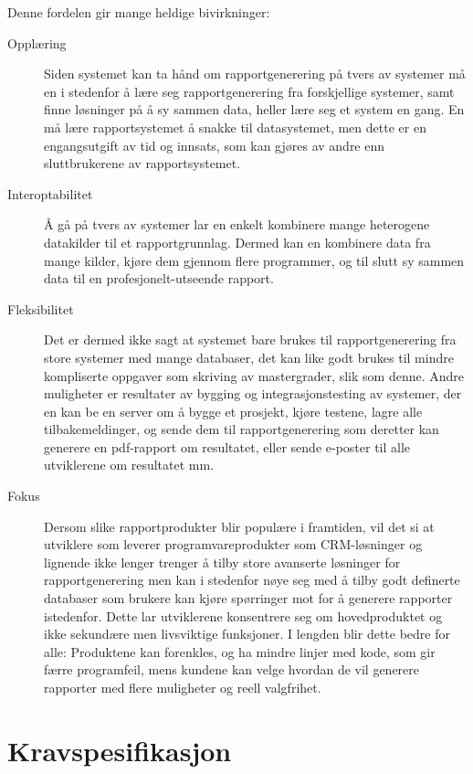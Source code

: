 \documentclass[11pt]{article}
\begin{document}
Denne fordelen gir mange heldige bivirkninger:
\begin{description}
\item [Opplæring]
  Siden systemet kan ta hånd om rapportgenerering på tvers av systemer må en i stedenfor å lære seg
  rapportgenerering fra forskjellige systemer, samt finne løsninger på å sy sammen data,
  heller lære seg et system en gang.
  En må lære rapportsystemet å snakke til datasystemet, men dette er en engangsutgift av tid og innsats,
  som kan gjøres av andre enn sluttbrukerene av rapportsystemet.
\item [Interoptabilitet]
  Å gå på tvers av systemer lar en enkelt kombinere mange heterogene datakilder til et rapportgrunnlag.
  Dermed kan en kombinere data fra mange kilder, kjøre dem gjennom flere programmer,
  og til slutt sy sammen data til en profesjonelt-utseende rapport.
\item [Fleksibilitet]
  Det er dermed ikke sagt at systemet bare brukes til rapportgenerering fra store systemer med mange
  databaser,
  det kan like godt brukes til mindre kompliserte oppgaver som skriving av mastergrader, slik som denne.
  Andre muligheter er resultater av bygging og integrasjonstesting av systemer,
  der en kan be en server om å bygge et prosjekt, kjøre testene, lagre alle tilbakemeldinger,
  og sende dem til rapportgenerering som deretter kan generere en pdf-rapport om resultatet,
  eller sende e-poster til alle utviklerene om resultatet mm.
\item [Fokus]
  Dersom slike rapportprodukter blir populære i framtiden, vil det si at utviklere som leverer
  programvareprodukter som CRM-løsninger og lignende ikke lenger trenger å tilby store avanserte
  løsninger for rapportgenerering men kan i stedenfor nøye seg med å tilby godt definerte databaser
  som brukere kan kjøre spørringer mot for å generere rapporter istedenfor.
  Dette lar utviklerene konsentrere seg om hovedproduktet og ikke sekundære men livsviktige funksjoner.
  I lengden blir dette bedre for alle:
  Produktene kan forenkles, og ha mindre linjer med kode, som gir færre programfeil,
  mens kundene kan velge hvordan de vil generere rapporter med flere muligheter og reell valgfrihet.
\end{description}

\section{Kravspesifikasjon}
\label{sec:kravspesifikasjon}
\end{document}
